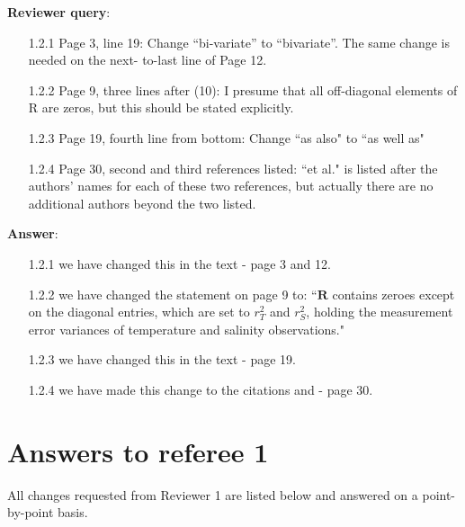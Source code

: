 \documentclass[a4paper]{article}
\newcommand{\bR}{ {\boldsymbol R} }
\def\reply{\textbf{Reviewer query}}
\def\action{\textbf{Answer}}
\begin{document}
\begin{answers}
\reply: 
\begin{itemize}[noitemsep,topsep=0pt,parsep=0pt,partopsep=0pt]

\item[1.2.1]\label{emc1} Page 3, line 19: Change “bi-variate” to “bivariate”. The same change is needed on the next-
to-last line of Page 12.

\item[1.2.2]\label{emc2} Page 9, three lines after (10): I presume that all off-diagonal elements of R are zeros, but this
should be stated explicitly.

\item[1.2.3]\label{emc3} Page 19, fourth line from bottom: Change ``as also" to ``as well as"

\item[1.2.4]\label{emc4} Page 30, second and third references listed: ``et al." is listed after the authors’ names for each
of these two references, but actually there are no additional authors beyond the two listed.

\end{itemize}

\action: 
\begin{itemize}[noitemsep,topsep=0pt,parsep=0pt,partopsep=0pt]

\item[1.2.1] we have changed this in the text - page 3 and 12.

\item[1.2.2] we have changed the statement on page 9 to: ``$\bR$ contains zeroes except on the diagonal entries, which are set to $r^2_T$ and $r^2_S$, holding the measurement error variances of temperature and salinity observations."

\item[1.2.3] we have changed this in the text - page 19.

\item[1.2.4] we have made this change to the citations \cite{genton2015cross} and \cite{french2016credible} - page 30.

\end{itemize}

\end{answers}

\section*{Answers to referee 1}
All changes requested from Reviewer 1 are listed below and answered on a point-by-point basis.
\end{document}
